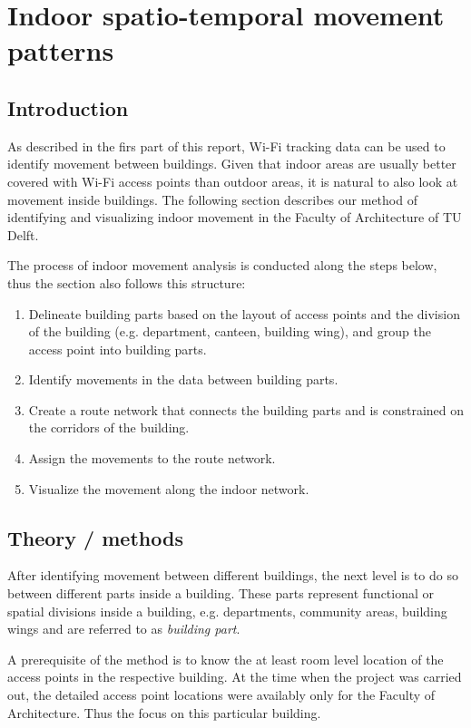 \chapter{Indoor spatio-temporal movement patterns}\label{indoormovement}
\section{Introduction}
As described in the firs part of this report, Wi-Fi tracking data can be used to
identify movement between buildings. Given that indoor areas are usually better
covered with Wi-Fi access points than outdoor areas, it is natural to also look
at movement inside buildings. The following section describes our method of
identifying and visualizing indoor movement in the Faculty of Architecture of TU
Delft.

The process of indoor movement analysis is conducted along the steps below,
thus the section also follows this structure:

\begin{enumerate}
    \item Delineate building parts based on the layout of access points
and the division of the building (e.g. department, canteen, building wing), and
group the access point into building parts.
    \item Identify movements in the data between building parts.
    \item Create a route network that connects the building parts and
    is constrained on the corridors of the building.
    \item Assign the movements to the route network.
    \item Visualize the movement along the indoor network.
\end{enumerate}

\section{Theory / methods}
After identifying movement between different buildings, the next level is to do
so between different parts inside a building. These parts represent
functional or spatial divisions inside a building, e.g. departments, community
areas, building wings and are referred to as \textit{building part}.

A prerequisite of the method is to know the at least room level location of the
access points in the respective building. At the time when the project
was carried out, the detailed access point locations were availably only for the
Faculty of Architecture. Thus the focus on this particular building.

